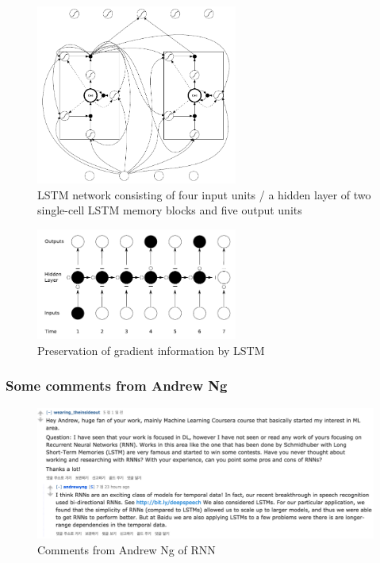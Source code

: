 \documentclass{beamer}
\begin{document}
\frame
{
		\begin{figure}[ht]  
			\begin{center}
				\includegraphics[width=2.6in]{Images/LSTM_network.png}   
			\end{center}   
			\caption{\centering LSTM network consisting of four input units / a hidden layer of two single-cell LSTM memory blocks and five output units}
		\end{figure}
}
\frame
{
		\begin{figure}[ht]  
			\begin{center}
				\includegraphics[width=2.6in]{Images/LSTM_preserving_gradient.png}   
			\end{center}   
			\caption{\centering Preservation of gradient information by LSTM}
		\end{figure}
}
\frame
{
  \frametitle{Some comments from Andrew Ng}
   \begin{figure}[ht]  
		\begin{center}
			\includegraphics[width=4.5in]{Images/comment_rnn_ng.png}   
		\end{center}   
		\caption{Comments from Andrew Ng of RNN}
	\end{figure}
}
\end{document}
